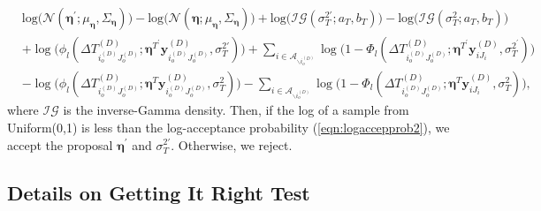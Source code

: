    \begin{equation}
    \begin{aligned} 
    &\mbox{log}\Big(\mathcal{N}(\boldsymbol{\eta}^{\prime};\mu_{\boldsymbol{\eta}}, \Sigma_{\boldsymbol{\eta}})\Big)-\mbox{log}\Big(\mathcal{N}(\boldsymbol{\eta};\mu_{\boldsymbol{\eta}}, \Sigma_{\boldsymbol{\eta}})\Big)+\mbox{log}\Big(\mathcal{IG}(\sigma_T^{2\prime};a_T, b_T)\Big)-\mbox{log}\Big(\mathcal{IG}(\sigma_T^2; a_T, b_T)\Big)\\&+ \log\Big(\phi_l(\Delta T^{(D)}_{i_o^{(D)}J_o^{(D)}}; \boldsymbol{\eta}^{T^\prime}\boldsymbol{y}^{(D)}_{i_o^{(D)}J_o^{(D)}}, \sigma_T^{2\prime})\Big)+ \sum_{i\in \mathcal{A}_{\backslash i_o^{(D)}}} \log\Big(1 - \Phi_l(\Delta T^{(D)}_{i_o^{(D)}J_o^{(D)}};\boldsymbol{\eta}^{T^\prime}\boldsymbol{y}^{(D)}_{iJ_i}, \sigma_T^{2^\prime})\Big)
    \\& -\log\Big(\phi_l(\Delta T^{(D)}_{i_o^{(D)}J_o^{(D)}}; \boldsymbol{\eta}^T\boldsymbol{y}^{(D)}_{i_o^{(D)}J_o^{(D)}}, \sigma_T^2)\Big)-\sum_{i\in \mathcal{A}_{\backslash i_o^{(D)}}} \log\Big(1 - \Phi_l(\Delta T^{(D)}_{i_o^{(D)}J_o^{(D)}};\boldsymbol{\eta}^T\boldsymbol{y}^{(D)}_{iJ_i}, \sigma_T^2)\Big),
    \end{aligned}\label{eqn:logaccepprob2}
    \end{equation}
    where $\mathcal{IG}$ is the inverse-Gamma density. Then, if the log of a sample from Uniform(0,1) is less than the log-acceptance probability (\ref{eqn:logaccepprob2}), we accept the proposal $\boldsymbol{\eta}^\prime$ and $\sigma_T^{2\prime}$. Otherwise, we reject.
       \subsection{Details on Getting It Right Test}\label{subsec:Details on GiR}
